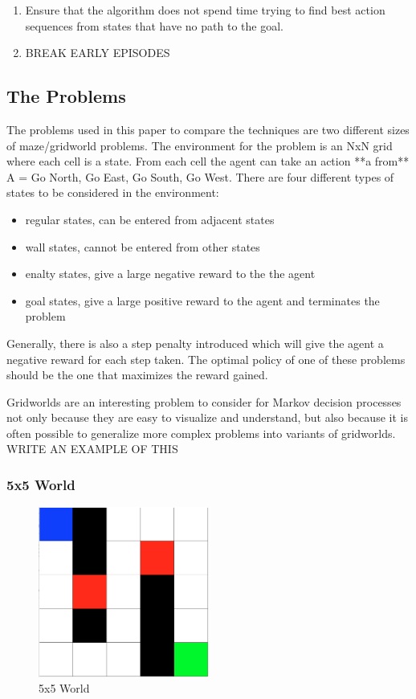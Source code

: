 \documentclass[a4paper,10pt]{article}
\begin{document}
\begin{enumerate}
\item Ensure that the algorithm does not spend time trying to find best action sequences from states that have no path to the goal.
\item BREAK EARLY EPISODES
\end{enumerate}

\subsection{The Problems}
The problems used in this paper to compare the techniques are two different sizes of maze/gridworld problems. The environment for the problem is an NxN grid where each cell is a state. From each cell the agent can take an action **a from** A = {Go North, Go East, Go South, Go West}. There are four different types of states to be considered in the environment: 

\begin{itemize}
\item regular states, can be entered from adjacent states
\item wall states, cannot be entered from other states
\item enalty states, give a large negative reward to the the agent
\item goal states, give a large positive reward to the agent and terminates the problem
\end{itemize}

Generally, there is also a step penalty introduced which will give the agent a negative reward for each step taken.
The optimal policy of one of these problems should be the one that maximizes the reward gained.

Gridworlds are an interesting problem to consider for Markov decision processes not only because they are easy to visualize and understand, but also because it is often possible to generalize more complex problems into variants of gridworlds. WRITE AN EXAMPLE OF THIS

\subsubsection{5x5 World}

\begin{figure}[h!]
\centering
\includegraphics[width=0.5\textwidth]{figures/5by5_nopolicy.png}
\caption{5x5 World}
\end{figure}
\end{document}
